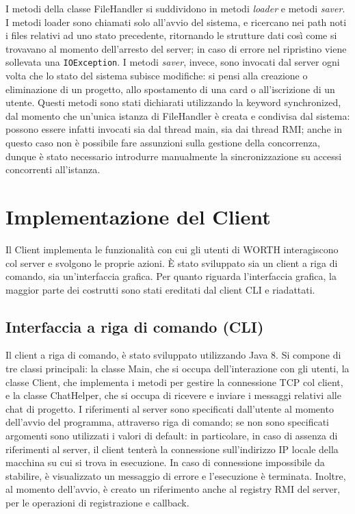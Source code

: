 \documentclass{article}
\begin{document}
I metodi della classe FileHandler si suddividono in metodi \emph{loader} e metodi \emph{saver}. I metodi loader sono chiamati solo all'avvio del sistema, e ricercano nei path noti i files relativi ad uno stato precedente, ritornando le strutture dati così come si trovavano al momento dell'arresto del server; in caso di errore nel ripristino viene sollevata una \texttt{IOException}. I metodi \emph{saver}, invece, sono invocati dal server ogni volta che lo stato del sistema subisce modifiche: si pensi alla creazione o eliminazione di un progetto, allo spostamento di una card o all'iscrizione di un utente. Questi metodi sono stati dichiarati utilizzando la keyword synchronized, dal momento che un'unica istanza di FileHandler è creata e condivisa dal sistema: possono essere infatti invocati sia dal thread main, sia dai thread RMI; anche in questo caso non è possibile fare assunzioni sulla gestione della concorrenza, dunque è stato necessario introdurre manualmente la sincronizzazione su accessi concorrenti all'istanza.




\newpage
\section{Implementazione del Client}
Il Client implementa le funzionalità con cui gli utenti di WORTH interagiscono col server e svolgono le proprie azioni. È stato sviluppato sia un client a riga di comando, sia un'interfaccia grafica. Per quanto riguarda l'interfaccia grafica, la maggior parte dei costrutti sono stati ereditati dal client CLI e riadattati. 

\subsection{Interfaccia a riga di comando (CLI)}
Il client a riga di comando, è stato sviluppato utilizzando Java 8. Si compone di tre classi principali: la classe Main, che si occupa dell'interazione con gli utenti, la classe Client, che implementa i metodi per gestire la connessione TCP col client, e la classe ChatHelper, che si occupa di ricevere e inviare i messaggi relativi alle chat di progetto. I riferimenti al server sono specificati dall'utente al momento dell'avvio del programma, attraverso riga di comando; se non sono specificati argomenti sono utilizzati i valori di default: in particolare, in caso di assenza di riferimenti al server, il client tenterà la connessione sull'indirizzo IP locale della macchina su cui si trova in esecuzione. In caso di connessione impossibile da stabilire, è visualizzato un messaggio di errore e l'esecuzione è terminata. Inoltre, al momento dell'avvio, è creato un riferimento anche al registry RMI del server, per le operazioni di registrazione e callback.
\end{document}
